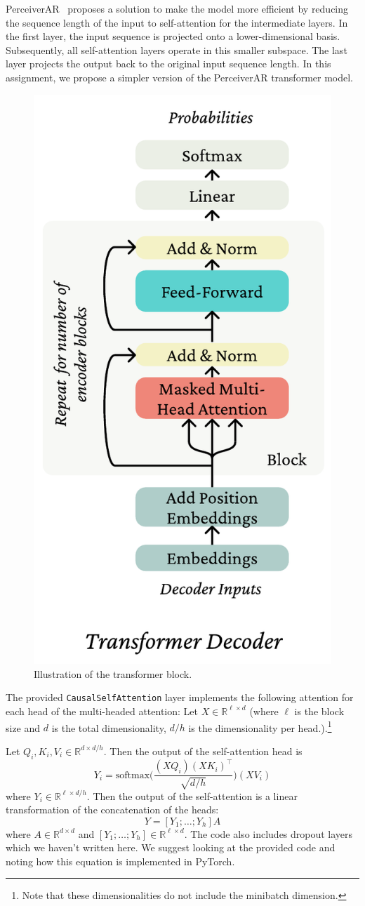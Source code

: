 \begin{parts}
PerceiverAR~\cite{hawthorne2022perceiver} proposes a solution to make the model more efficient by reducing the sequence length of the input to self-attention for the intermediate layers. In the first layer, the input sequence is projected onto a lower-dimensional basis. Subsequently, all self-attention layers operate in this smaller subspace. The last layer projects the output back to the original input sequence length. In this assignment, we propose a simpler version of the PerceiverAR transformer model.

\begin{figure}[h]
\centering
\captionsetup{justification=centering}
\includegraphics[height=0.6\linewidth]{images/decoder.pdf}
\caption{Illustration of the transformer block.}
\label{fig:tranformer_block}
\end{figure}

The provided \texttt{CausalSelfAttention} layer implements the following attention for each head of the multi-headed attention: Let $X\in \mathbb{R}^{\ell \times d}$ (where $\ell$ is the block size and $d$ is the total dimensionality, $d/h$ is the dimensionality per head.).\footnote{Note that these dimensionalities do not include the minibatch dimension.}

Let $Q_i,K_i,V_i \in \mathbb{R}^{d\times d/h}$.
Then the output of the self-attention head is 
\begin{equation} \label{qkv_eqn}
Y_i = \text{softmax}\bigg(\frac{(XQ_i)(XK_i)^\top}{\sqrt{d/h}}\bigg)(XV_i)
\end{equation}
where $Y_i\in\mathbb{R}^{\ell \times d/h}$.
Then the output of the self-attention is a linear transformation of the concatenation of the heads:
\begin{equation}
Y = [Y_1;\dots;Y_h]A
\end{equation}
where $A \in\mathbb{R}^{d\times d}$ and $[Y_1;\dots;Y_h]\in\mathbb{R}^{\ell \times d}$.
The code also includes dropout layers which we haven't written here.
We suggest looking at the provided code and noting how this equation is implemented in PyTorch.


\end{parts}
